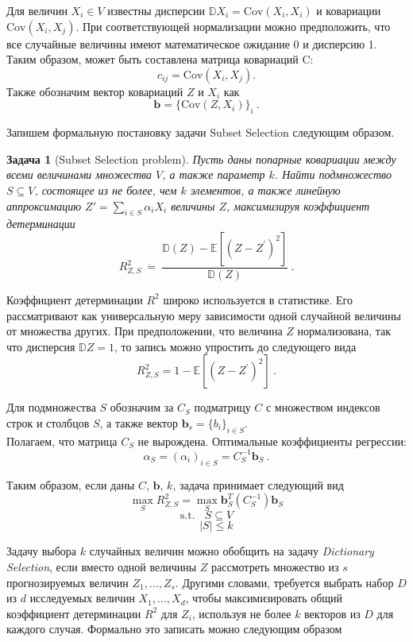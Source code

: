 \documentclass[preprint,12pt]{elsarticle}
\newtheorem{problem}{Задача}
\begin{document}
Для величин $X_i \in V$ известны дисперсии $\mathbb{D}X_i = \mathrm{Cov}(X_i, X_i)$ и ковариации $\mathrm{Cov}(X_i, X_j)$. 
При соответствующей нормализации можно предположить, что все случайные величины имеют математическое ожидание 0 и дисперсию 1. 
Таким образом, может быть составлена матрица ковариаций C:
\[c_{ij} = \mathrm{Cov}(X_i, X_j).\] 
Также обозначим вектор ковариаций $Z$ и $X_i$ как 
\[\textbf{b}= \{\mathrm{Cov}(Z, X_i)\}_i~.\] 

Запишем формальную постановку задачи Subset Selection следующим образом.

\begin{problem}[Subset Selection problem]
Пусть даны попарные ковариации между всеми величинами множества $V$, а также параметр $k$. Найти подмножество $S\subseteq V$, состоящее из не более, чем $k$ элементов, а также линейную аппроксимацию $Z'=\sum\limits_{i\in S} \alpha_i X_i$ величины $Z$, максимизируя коэффициент детерминации 
\[R_{Z, S}^{2}~\dot{=}~\frac{\mathbb{D}(Z)-\mathbb{E}\left[\left(Z-Z^{\prime}\right)^2\right]}{\mathbb{D}(Z)}~.\]
\end{problem}

Коэффициент детерминации $R^2$ широко используется в статистике. Его рассматривают как универсальную меру зависимости одной случайной величины от множества других. При предположении, что величина $Z$ нормализована, так что дисперсия $\mathbb{D}Z = 1$, то запись можно упростить до следующего вида
\[R_{Z, S}^{2} = 1-\mathbb{E}\left[\left(Z-Z^{\prime}\right)^2\right]~.\]

Для подмножества $S$ обозначим за $C_S$ подматрицу $C$ с множеством индексов строк и столбцов $S$, а также вектор $\textbf{b}_s = \{b_i\}_{i\in S}$.\\

Полагаем, что матрица $C_S$ не вырождена. Оптимальные коэффициенты регрессии: %
\[\alpha_{S}=\left(\alpha_{i}\right)_{i \in S}=C_{S}^{-1}\mathbf{b}_{S}~.\]

Таким образом, если даны $C$, $\textbf{b}$, $k$, задача принимает следующий вид 
\[\max_S R_{Z, S}^{2}=\max_S \mathbf{b}_{S}^{T}\left(C_{S}^{-1}\right) \mathbf{b}_{S}\]
\[\text{s.t.}~~~~ S \subseteq V\]
\[~~~~~~~~|S| \leqslant k\]

Задачу выбора $k$ случайных величин можно обобщить на задачу \textit{Dictionary Selection}, если вместо одной величины $Z$ рассмотреть множество из $s$ прогнозируемых величин $Z_1, \dots, Z_s$. Другими словами, требуется выбрать набор $D$ из $d$ исследуемых величин $X_1, ..., X_d$, чтобы максимизировать общий коэффициент детерминации $R^2$ для $Z_i$, используя не более $k$ векторов из $D$ для каждого случая. Формально это записать можно следующим образом
\end{document}
